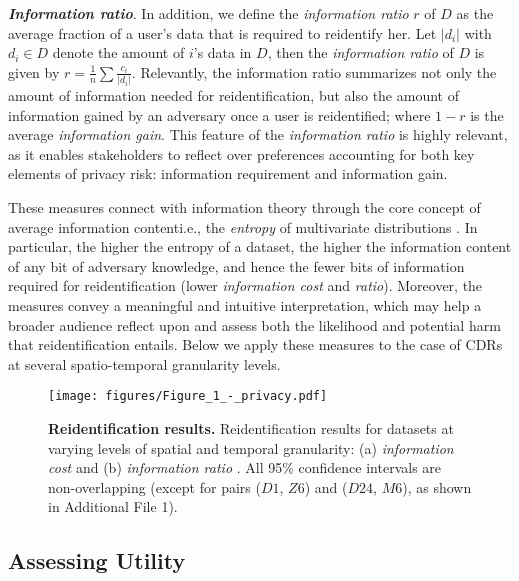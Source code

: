 \documentclass[12pt]{article}
\begin{document}
\vspace{.2cm}
\textbf{\textit{Information ratio}}. In addition, we define the \textit{information ratio} $r$ of $D$ as the average fraction of a user's data that is required to reidentify her. Let $|d_i|$ with $d_i \in D$ denote the amount of $i$'s data in $D$, then the \textit{information ratio} of $D$ is given by $r = \frac{1}{n} \sum \frac{c_i}{|d_i|}$. Relevantly, the information ratio summarizes not only the amount of information needed for reidentification, but also the amount of information gained by an adversary once a user is reidentified; where\hspace{3pt}  $1 - r$  \hspace{1pt} is the average \textit{information gain}. This feature of the \textit{information ratio} is highly relevant, as it enables stakeholders to reflect over preferences accounting for both key elements of privacy risk: information requirement and information gain.     

\vspace{.2cm}
These measures connect with information theory through the core concept of average information content\textemdash i.e., the \textit{entropy} of multivariate distributions \cite{mackay2003information}. In particular, the higher the entropy of a dataset, the higher the information content of any bit of adversary knowledge, and hence the fewer bits of information required for reidentification (lower \textit{information cost} and \textit{ratio}). Moreover, the measures convey a meaningful and intuitive interpretation, which may help a broader audience reflect upon and assess both the likelihood and potential harm that reidentification entails. Below we apply these measures to the case of CDRs at several spatio-temporal granularity levels.

\begin{figure}[h]
\centering
\texttt{[image: figures/Figure\_1\_-\_privacy.pdf]}
\caption{ \textbf{Reidentification results.} Reidentification results for datasets at varying levels of spatial and temporal granularity: (a) \textit{information cost} and (b) \textit{information ratio} . All 95\% confidence intervals are non-overlapping (except for pairs ($D1$, $Z6$) and ($D24$, $M6$), as shown in Additional File 1).}
\label{fig:privacy}
\end{figure}

\subsection{\textbf{Assessing Utility}}
\label{sec:methods-usefulness}
\vspace{8pt}
\end{document}
